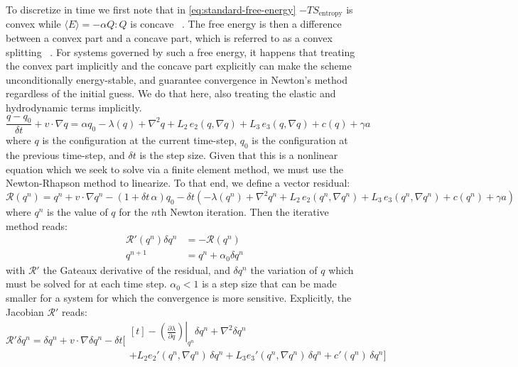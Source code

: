 \documentclass[reqno]{article}
\begin{document}
  To discretize in time we first note that in \eqref{eq:standard-free-energy}
  $-TS_\text{entropy}$ is convex while $\langle E \rangle = -\alpha Q:Q$ is
  concave ~\cite{schimming_numerical_2021}.
  The free energy is then a difference between a convex part and a concave part,
  which is referred to as a convex splitting ~\cite{xu_stability_2019}.
  For systems governed by such a free energy, it happens that treating the
  convex part implicitly and the concave part explicitly can make the scheme
  unconditionally energy-stable, and guarantee convergence in Newton's method
  regardless of the initial guess.
  We do that here, also treating the elastic and hydrodynamic terms implicitly.
  \begin{equation}
    \frac{q - q_0}{\delta t}
    + v \cdot \nabla q
    =
    \alpha q_0
    - \lambda(q)
    + \nabla^2 q
    + L_2 \, e_2(q, \nabla q)
    + L_3 \, e_3(q, \nabla q)
    + c(q)
    + \gamma a
  \end{equation}
  where $q$ is the configuration at the current time-step, $q_0$ is the
  configuration at the previous time-step, and $\delta t$ is the step size.
  Given that this is a nonlinear equation which we seek to solve via a finite
  element method, we must use the Newton-Rhapson method to linearize.
  To that end, we define a vector residual:
  \begin{equation} \label{eq:simulation-residual}
    \mathcal{R}(q^n)
    =
    q^n + v \cdot \nabla q^n
    - (1 + \delta t \, \alpha) q_0
    - 
    \delta t \left(
      -\lambda(q^n)
      + \nabla^2 q^n
      + L_2 \, e_2(q^n, \nabla q^n)
      + L_3 \, e_3(q^n, \nabla q^n)
      + c(q^n)
      + \gamma a
    \right)
  \end{equation}
  where $q^n$ is the value of $q$ for the $n$th Newton iteration.
  Then the iterative method reads:
  \begin{equation}
    \begin{split}
      \mathcal{R}'(q^n) \delta q^n &= -\mathcal{R}(q^n) \\
      q^{n + 1} &= q^n + \alpha_0 \delta q^n
    \end{split}
  \end{equation}
  with $\mathcal{R}'$ the Gateaux derivative of the residual, and $\delta q^n$
  the variation of $q$ which must be solved for at each time step.
  $\alpha_0 < 1$ is a step size that can be made smaller for a system for which
  the convergence is more sensitive.
  Explicitly, the Jacobian $\mathcal{R}'$ reads:
  \begin{equation}
    \mathcal{R}' \delta q^n
    =
      \delta q^n
      + v \cdot \nabla \delta q^n
      -\delta t \biggl[
      \begin{multlined}[t]
        - \left. \left( \frac{\partial \lambda}{\partial q} \right) \right|_{q^n} \delta q^n
        + \nabla^2 \delta q^n \\
        + L_2 e_2'(q^n, \nabla q^n) \, \delta q^n
        + L_3 e_3'(q^n, \nabla q^n) \, \delta q^n
        + c'(q^n) \, \delta q^n
      \biggr]
    \end{multlined}
  \end{equation}
\end{document}
